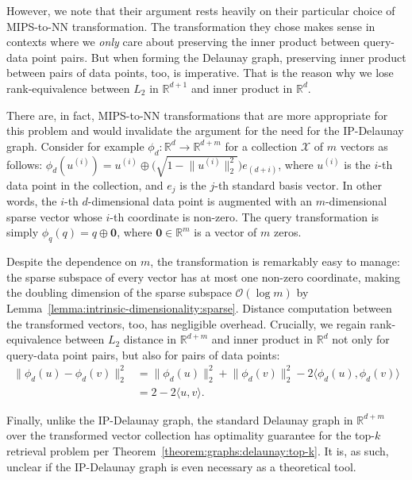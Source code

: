 However, we note that their argument rests heavily on their particular choice of
MIPS-to-NN transformation. The transformation they chose makes sense in
contexts where we \emph{only} care about preserving the inner product between query-data
point pairs. But when forming the Delaunay graph, preserving inner product between pairs of
data points, too, is imperative. That is the reason why we lose rank-equivalence
between $L_2$ in $\mathbb{R}^{d+1}$ and inner product in $\mathbb{R}^d$.

There are, in fact, MIPS-to-NN transformations that are more appropriate for this problem
and would invalidate the argument for the need for the IP-Delaunay graph.
Consider for example $\phi_d: \mathbb{R}^d \rightarrow \mathbb{R}^{d + m}$ for a collection
$\mathcal{X}$ of $m$ vectors as follows:
$\phi_d(u^{(i)}) = u^{(i)} \oplus \big(\sqrt{1 - \lVert u^{(i)} \rVert_2^2}\big) e_{(d + i)}$,
where $u^{(i)}$ is the $i$-th data point in the collection, and
$e_j$ is the $j$-th standard basis vector. In other words, the $i$-th $d$-dimensional
data point is augmented with an $m$-dimensional
sparse vector whose $i$-th coordinate is non-zero.
The query transformation is simply $\phi_q(q) = q \oplus \mathbf{0}$, where $\mathbf{0} \in \mathbb{R}^m$
is a vector of $m$ zeros.

Despite the dependence on $m$, the transformation is remarkably easy to manage:
the sparse subspace of every vector has at most one non-zero coordinate,
making the doubling dimension of the sparse subspace $\mathcal{O}(\log m)$
by Lemma~\ref{lemma:intrinsic-dimensionality:sparse}.
Distance computation between the transformed vectors, too, has negligible overhead.
Crucially, we regain rank-equivalence between $L_2$ distance in $\mathbb{R}^{d + m}$
and inner product in $\mathbb{R}^d$ not only for query-data point pairs, but also
for pairs of data points:
\begin{align*}
    \lVert \phi_d(u) - \phi_d(v) \rVert_2^2 &=
        \lVert \phi_d(u) \rVert_2^2 + \lVert \phi_d(v) \rVert_2^2 - 2 \langle \phi_d(u), \phi_d(v) \rangle \\
    &= 2 - 2\langle u, v \rangle.
\end{align*}

Finally, unlike the IP-Delaunay graph, the standard Delaunay graph in $\mathbb{R}^{d + m}$
over the transformed vector collection has optimality guarantee for the 
top-$k$ retrieval problem per Theorem~\ref{theorem:graphs:delaunay:top-k}.
It is, as such, unclear if the IP-Delaunay graph is even necessary as a theoretical tool.


